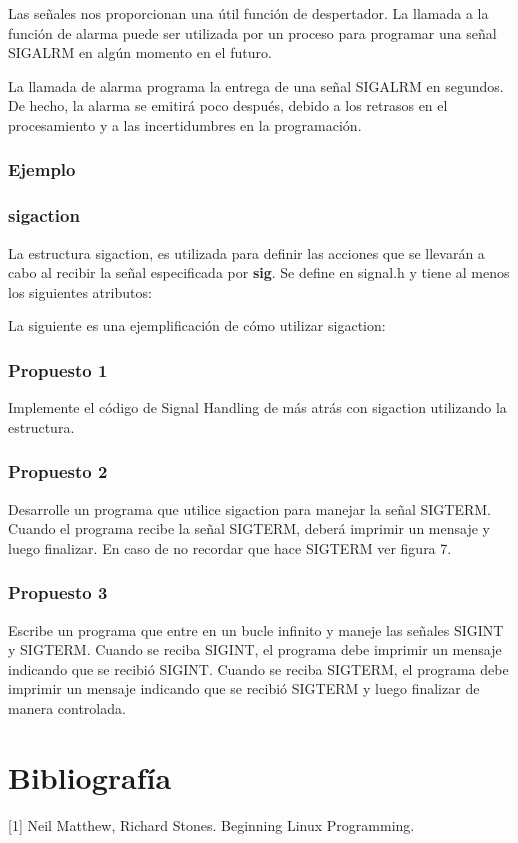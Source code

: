\documentclass[journal]{IEEEtai}
\begin{document}
Las señales nos proporcionan una útil función de despertador. La llamada a la función de alarma puede ser utilizada por un proceso para
programar una señal SIGALRM en algún momento en el futuro.

La llamada de alarma programa la entrega de una señal SIGALRM en segundos. De hecho, la alarma se emitirá poco después, debido a los retrasos en el procesamiento y a las incertidumbres en la programación.



\subsubsection{Ejemplo}



\subsubsection{sigaction}



La estructura sigaction, es utilizada para definir las acciones que se llevarán a cabo al recibir la señal especificada por \textbf{sig}. Se define en signal.h y tiene al menos los siguientes atributos:



La siguiente es una ejemplificación de cómo utilizar sigaction:



\subsubsection{\textbf{Propuesto 1}} Implemente el código de Signal Handling de más atrás con sigaction utilizando la estructura.

\subsubsection{\textbf{Propuesto 2}} Desarrolle un programa que utilice sigaction para manejar la señal SIGTERM. Cuando el programa recibe la señal SIGTERM, deberá imprimir un mensaje y luego finalizar. En caso de no recordar que hace SIGTERM ver figura 7.

\subsubsection{\textbf{Propuesto 3}} Escribe un programa que entre en un bucle infinito y maneje las señales SIGINT y SIGTERM. Cuando se reciba SIGINT, el programa debe imprimir un mensaje indicando que se recibió SIGINT. Cuando se reciba SIGTERM, el programa debe imprimir un mensaje indicando que se recibió SIGTERM y luego finalizar de manera controlada.


\section{Bibliografía}

[1] Neil Matthew, Richard Stones. Beginning Linux Programming.
 
\end{document}
